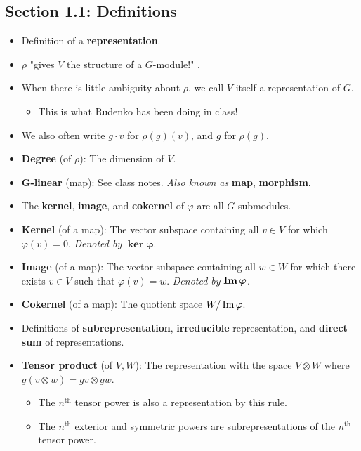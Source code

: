 \documentclass[../notes.tex]{subfiles}
\begin{document}
\subsection*{Section 1.1: Definitions}
\begin{itemize}
    \item Definition of a \textbf{representation}.
    \item $\rho$ "gives $V$ the structure of a $G$-module!" \parencite[3]{bib:FultonHarris}.
    \item When there is little ambiguity about $\rho$, we call $V$ itself a representation of $G$.
    \begin{itemize}
        \item This is what Rudenko has been doing in class!
    \end{itemize}
    \item We also often write $g\cdot v$ for $\rho(g)(v)$, and $g$ for $\rho(g)$.
    \item \textbf{Degree} (of $\rho$): The dimension of $V$.
    \item \textbf{$\bm{G}$-linear} (map): See class notes. \emph{Also known as} \textbf{map}, \textbf{morphism}.
    \item The \textbf{kernel}, \textbf{image}, and \textbf{cokernel} of $\varphi$ are all $G$-submodules.
    \item \textbf{Kernel} (of a map): The vector subspace containing all $v\in V$ for which $\varphi(v)=0$. \emph{Denoted by} $\bm{\ker\varphi}$.
    \item \textbf{Image} (of a map): The vector subspace containing all $w\in W$ for which there exists $v\in V$ such that $\varphi(v)=w$. \emph{Denoted by} $\bm{\im\varphi}$.
    \item \textbf{Cokernel} (of a map): The quotient space $W/\operatorname{Im}\varphi$.
    \item Definitions of \textbf{subrepresentation}, \textbf{irreducible} representation, and \textbf{direct sum} of representations.
    \item \textbf{Tensor product} (of $V,W$): The representation with the space $V\otimes W$ where $g(v\otimes w)=gv\otimes gw$.
    \begin{itemize}
        \item {}The $n^\text{th}$ tensor power is also a representation by this rule.
        \item The $n^\text{th}$ exterior and symmetric powers are subrepresentations of the $n^\text{th}$ tensor power.
    \end{itemize}

\end{itemize}
\end{document}
